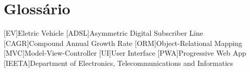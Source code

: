 \chapter{Glossário}

\footnotesize
\SingleSpacing

\begin{multicols}{2}
\begin{acronym}[AAAAAA]

	[EV]{Eletric Vehicle}
	[ADSL]{Asymmetric Digital Subscriber Line}
	[CAGR]{Compound Annual Growth Rate}
	[ORM]{Object-Relational Mapping}
	[MVC]{Model-View-Controller}
	[UI]{User Interface}
	[PWA]{Progressive Web App}
	[IEETA]{Department of Electronics, Telecommunications and Informatics}


\end{acronym}
\end{multicols}

